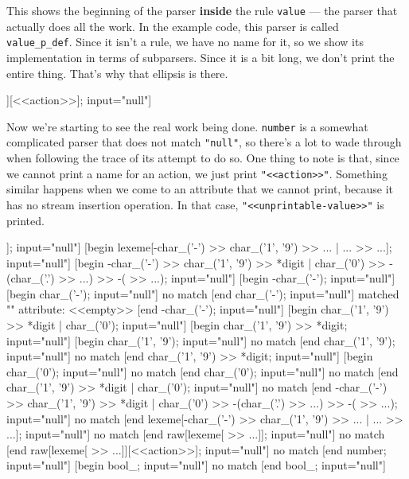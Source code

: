 \begin{code}
[begin number | bool_ | null | string | ...; input="null"]
\end{code}

This shows the beginning of the parser \textbf{inside} the rule \texttt{value} --- the parser that actually does all the work. In the example code, this parser is called \texttt{value\_p\_def}. Since it isn't a rule, we have no name for it, so we show its implementation in terms of subparsers. Since it is a bit long, we don't print the entire thing. That's why that ellipsis is there.

\begin{code}
[begin number; input="null"]
  [begin raw[lexeme[ >> ...]][<<action>>]; input="null"]
\end{code}

Now we're starting to see the real work being done. \texttt{number} is a somewhat complicated parser that does not match \texttt{"null"}, so there's a lot to wade through when following the trace of its attempt to do so. One thing to note is that, since we cannot print a name for an action, we just print \texttt{"<<action>>"}. Something similar happens when we come to an attribute that we cannot print, because it has no stream insertion operation. In that case, \texttt{"<<unprintable-value>>"} is printed.

\begin{code}
    [begin raw[lexeme[ >> ...]]; input="null"]
      [begin lexeme[-char_('-') >> char_('1', '9') >> ... | ... >> ...]; input="null"]
        [begin -char_('-') >> char_('1', '9') >> *digit | char_('0') >> -(char_('.') >> ...) >> -( >> ...); input="null"]
          [begin -char_('-'); input="null"]
            [begin char_('-'); input="null"]
              no match
            [end char_('-'); input="null"]
            matched ""
            attribute: <<empty>>
          [end -char_('-'); input="null"]
          [begin char_('1', '9') >> *digit | char_('0'); input="null"]
            [begin char_('1', '9') >> *digit; input="null"]
              [begin char_('1', '9'); input="null"]
                no match
              [end char_('1', '9'); input="null"]
              no match
            [end char_('1', '9') >> *digit; input="null"]
            [begin char_('0'); input="null"]
              no match
            [end char_('0'); input="null"]
            no match
          [end char_('1', '9') >> *digit | char_('0'); input="null"]
          no match
        [end -char_('-') >> char_('1', '9') >> *digit | char_('0') >> -(char_('.') >> ...) >> -( >> ...); input="null"]
        no match
      [end lexeme[-char_('-') >> char_('1', '9') >> ... | ... >> ...]; input="null"]
      no match
    [end raw[lexeme[ >> ...]]; input="null"]
    no match
  [end raw[lexeme[ >> ...]][<<action>>]; input="null"]
  no match
[end number; input="null"]
[begin bool_; input="null"]
  no match
[end bool_; input="null"]
\end{code}

